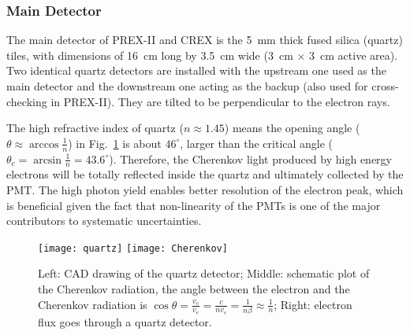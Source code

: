 \subsubsection{Main Detector}
The main detector of PREX-II and CREX is the 5~mm thick fused silica (quartz) tiles,
with dimensions of 16~cm long by 3.5~cm wide (3~cm $\times$ 3~cm active area). 
Two identical quartz detectors are installed with the upstream one used as the 
main detector and the downstream one acting as the backup (also used for cross-checking 
in PREX-II). They are tilted to be perpendicular to the electron rays.

The high refractive index of quartz ($n\approx 1.45$) means the opening angle ($\theta \approx \arccos\frac{1}{n}$)
in Fig.~\ref{fig:quartz} is about $46^\circ$, larger than the critical angle 
($\theta_c = \arcsin\frac{1}{n} = 43.6^\circ$).
Therefore, the Cherenkov light produced by high energy electrons will be totally
reflected inside the quartz and ultimately collected by the PMT. The high photon
yield enables better resolution of the electron peak, which is beneficial given
the fact that non-linearity of the PMTs is one of the major contributors to 
systematic uncertainties.
\begin{figure}[!h]
    \centering
    \texttt{[image: quartz]}
    \texttt{[image: Cherenkov]}
    \caption[quartz]{Left: CAD drawing of the quartz detector; 
    Middle: schematic plot of the Cherenkov radiation, the angle between 
    the electron and the Cherenkov radiation is 
    $\cos\theta = \frac{v_c}{v_e} = \frac{c}{nv_e} = \frac{1}{n\beta} \approx \frac{1}{n}$;
    Right: electron flux goes through a quartz detector.
    }
    \label{fig:quartz}
\end{figure}

